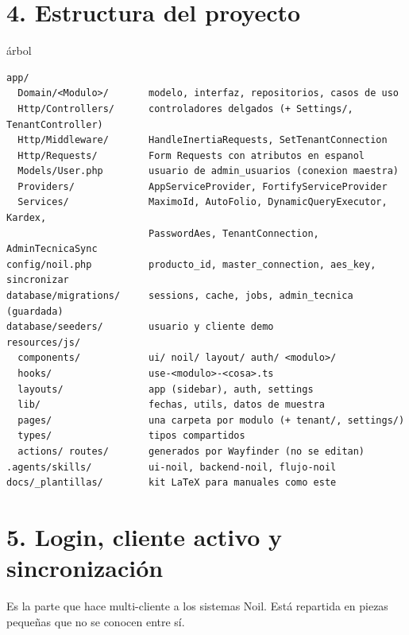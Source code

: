 \documentclass[11pt]{article}
\begin{document}
\section{4. Estructura del proyecto}
\begin{termbox}{\'arbol}
\begin{lstlisting}[style=plain]
app/
  Domain/<Modulo>/       modelo, interfaz, repositorios, casos de uso
  Http/Controllers/      controladores delgados (+ Settings/, TenantController)
  Http/Middleware/       HandleInertiaRequests, SetTenantConnection
  Http/Requests/         Form Requests con atributos en espanol
  Models/User.php        usuario de admin_usuarios (conexion maestra)
  Providers/             AppServiceProvider, FortifyServiceProvider
  Services/              MaximoId, AutoFolio, DynamicQueryExecutor, Kardex,
                         PasswordAes, TenantConnection, AdminTecnicaSync
config/noil.php          producto_id, master_connection, aes_key, sincronizar
database/migrations/     sessions, cache, jobs, admin_tecnica (guardada)
database/seeders/        usuario y cliente demo
resources/js/
  components/            ui/ noil/ layout/ auth/ <modulo>/
  hooks/                 use-<modulo>-<cosa>.ts
  layouts/               app (sidebar), auth, settings
  lib/                   fechas, utils, datos de muestra
  pages/                 una carpeta por modulo (+ tenant/, settings/)
  types/                 tipos compartidos
  actions/ routes/       generados por Wayfinder (no se editan)
.agents/skills/          ui-noil, backend-noil, flujo-noil
docs/_plantillas/        kit LaTeX para manuales como este
\end{lstlisting}
\end{termbox}

\section{5. Login, cliente activo y sincronizaci\'on}
Es la parte que hace multi-cliente a los sistemas Noil. Est\'a repartida en piezas peque\~nas que no se conocen entre s\'i.
\end{document}
